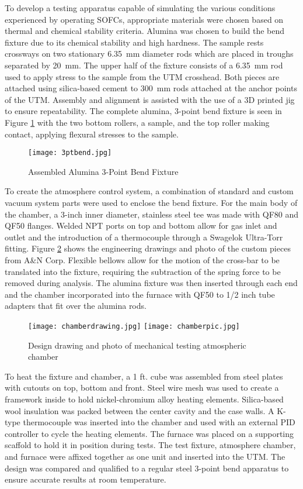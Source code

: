 To develop a testing apparatus capable of simulating the various conditions experienced by operating SOFCs, appropriate materials were chosen based on thermal and chemical stability criteria.
Alumina was chosen to build the bend fixture due to its chemical stability and high hardness.
The sample rests crossways on two stationary \SI{6.35}{\milli\meter} diameter rods which are placed in troughs separated by \SI{20}{\milli\meter}.
The upper half of the fixture consists of a \SI{6.35}{\milli\meter} rod used to apply stress to the sample from the UTM crosshead.
Both pieces are attached using silica-based cement to \SI{300}{\milli\meter} rods attached at the anchor points of the UTM.
Assembly and alignment is assisted with the use of a 3D printed jig to ensure repeatability.
The complete alumina, 3-point bend fixture is seen in Figure \ref{fig:3ptbend} with the two bottom rollers, a sample, and the top roller making contact, applying flexural stresses to the sample.

\begin{figure}
    \texttt{[image: 3ptbend.jpg]}
    \caption{Assembled Alumina 3-Point Bend Fixture}
    \label{fig:3ptbend}
\end{figure}

To create the atmosphere control system, a combination of standard and custom vacuum system parts were used to enclose the bend fixture.
For the main body of the chamber, a 3-inch inner diameter, stainless steel tee was made with QF80 and QF50 flanges.
Welded NPT ports on top and bottom allow for gas inlet and outlet and the introduction of a thermocouple through a Swagelok Ultra-Torr fitting.
Figure \ref{fig:chamber} shows the engineering drawings and photo of the custom pieces from A\&N Corp.
Flexible bellows allow for the motion of the cross-bar to be translated into the fixture, requiring the subtraction of the spring force to be removed during analysis.
The alumina fixture was then inserted through each end and the chamber incorporated into the furnace with QF50 to 1/2 inch tube adapters that fit over the alumina rods.

\begin{figure}
    \texttt{[image: chamberdrawing.jpg]}
    \texttt{[image: chamberpic.jpg]}
    \caption{Design drawing and photo of mechanical testing atmospheric chamber}
    \label{fig:chamber}
\end{figure}

To heat the fixture and chamber, a 1 ft. cube was assembled from steel plates with cutouts on top, bottom and front.
Steel wire mesh was used to create a framework inside to hold nickel-chromium alloy heating elements.
Silica-based wool insulation was packed between the center cavity and the case walls.
A K-type thermocouple was inserted into the chamber and used with an external PID controller to cycle the heating elements.
The furnace was placed on a supporting scaffold to hold it in position during tests.
The test fixture, atmosphere chamber, and furnace were affixed together as one unit and inserted into the UTM.
The design was compared and qualified to a regular steel 3-point bend apparatus to ensure accurate results at room temperature.

